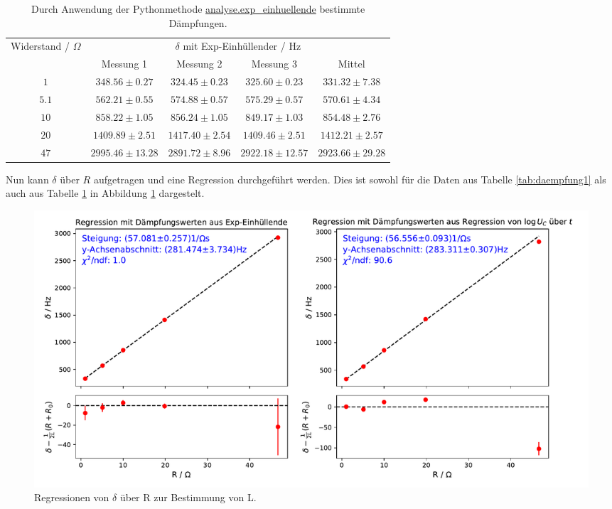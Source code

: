 \documentclass[a4paper, 12pt]{scrartcl}
\begin{document}
\begin{table}[H]
\centering
\begin{adjustbox}{width=\textwidth}
\begin{tabular}{c|cccc}
\multirow{2}{*}{Widerstand / $\Omega$} & \multicolumn{4}{c}{$\delta$ mit Exp-Einhüllender / Hz} \\
\cline{2-5}
& Messung 1 & Messung 2 & Messung 3 & Mittel\\
\hline
$1$ & $348.56 \pm 0.27$ & $324.45\pm 0.23$ & $325.60\pm 0.23$ & $331.32\pm 7.38$ \\
$5.1$ & $562.21 \pm 0.55$ & $574.88\pm 0.57$ & $575.29\pm 0.57$ & $570.61\pm 4.34$ \\
$10$ & $858.22 \pm 1.05$ & $856.24\pm 1.05$ & $849.17\pm 1.03$ & $854.48\pm 2.76$ \\
$20$ & $1409.89 \pm 2.51$ & $1417.40\pm 2.54$ & $1409.46\pm 2.51$ & $1412.21\pm 2.57$ \\
$47$ & $2995.46 \pm 13.28$ & $2891.72\pm 8.96$ & $2922.18\pm 12.57$ & $2923.66\pm 29.28$
\end{tabular}
\end{adjustbox}
\caption{Durch Anwendung der Pythonmethode \url{analyse.exp_einhuellende} bestimmte Dämpfungen.}
\label{tab:daempfung2}
\end{table}

Nun kann $\delta$ über $R$ aufgetragen und eine Regression durchgeführt werden. Dies ist sowohl für die Daten aus Tabelle \ref{tab:daempfung1} als auch aus Tabelle \ref{tab:daempfung2} in Abbildung \ref{abb:reg_Rdelta} dargestelt.

\begin{figure}[H]
\centering
\includegraphics[width=\textwidth]{plots/reg_delR.pdf}
\caption{Regressionen von $\delta$ über R zur Bestimmung von L.}
\label{abb:reg_Rdelta}
\end{figure}
\end{document}
